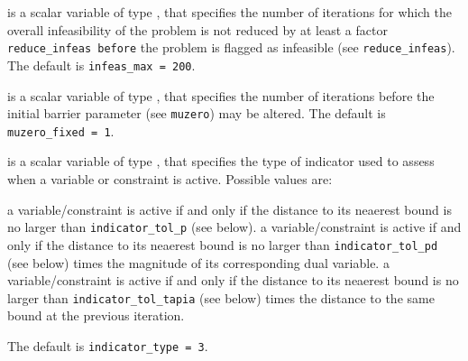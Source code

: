 \documentclass{galahad}
\begin{document}
\begin{description}




 is a scalar variable of type \integer, that specifies
the number of iterations for which the overall infeasibility
of the problem is not reduced by at least a factor {\tt reduce\_infeas
before} the problem is flagged as infeasible (see {\tt reduce\_infeas}).
The default is {\tt infeas\_max = 200}.

 is a scalar variable of type \integer, 
that specifies
the number of iterations before the initial barrier parameter 
(see {\tt muzero}) may be altered.
The default is {\tt muzero\_fixed = 1}.

 is a scalar variable of type \integer, 
that specifies the type of indicator used to assess when a variable or
constraint is active.
Possible values are:

\begin{description}
 a variable/constraint is active if and only if the distance 
to its neaerest bound is no larger than {\tt indicator\-\_tol\_p} (see below).
 a variable/constraint is active if and only if the distance 
to its neaerest bound is no larger than {\tt indicator\-\_tol\_pd} 
(see below) times the magnitude of its corresponding dual variable.
 a variable/constraint is active if and only if the distance 
to its neaerest bound is no larger than {\tt indicator\-\_tol\_tapia} 
(see below) times the distance to the same bound at the previous iteration.
\end{description}
The default is {\tt indicator\_type = 3}.


\end{description}
\end{document}

